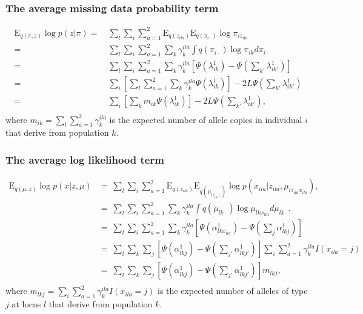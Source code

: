 \documentclass[12pt,a4paper,reqno]{article}
\newcommand{\E}{\text{E}{}}
\newcommand{\(}{\left(}
\newcommand{\)}{\right)}
\newcommand{\|}{\arrowvert}
\renewcommand{\digamma}{\Psi}
\begin{document}
\subsubsection{The average missing data probability term}
\begin{align*}
  \E_{q(\pi,z)}\log p(z|\pi) 
  =&~ \sum_{l} \sum_{i} \sum_{a=1}^{2} \E_{q(z_{ila})}\E_{q(\pi_{i\cdot})} \log \pi_{iz_{ila}} \\
  =&~ \sum_{l} \sum_{i} \sum_{a=1}^{2} \sum_{k} \gamma^{ila}_{k} \int q(\pi_{i\cdot}) \log \pi_{ik} d\pi_{i\cdot} \\
  =&~ \sum_{l} \sum_{i} \sum_{a=1}^{2} \sum_{k} \gamma^{ila}_{k} \left[\digamma(\lambda^{1}_{ik}) - \digamma(\sum_{k'}\lambda^{1}_{ik'})\right] \\
  =&~ \sum_{i} \left[ \sum_{l} \sum_{a=1}^{2} \sum_{k} \gamma^{ila}_{k} \digamma(\lambda^{1}_{ik})\right] - 2L\digamma(\sum_{k'}\lambda^{1}_{ik'})\\
  =&~ \sum_{i} \left[ \sum_{k} m_{ik} \digamma(\lambda^{1}_{ik})\right] - 2L\digamma(\sum_{k'}\lambda^{1}_{ik'}),\\
\end{align*}
where $m_{ik} = \sum_{l} \sum_{a=1}^{2} \gamma^{ila}_{k}$ is the expected number of allele copies in individual $i$ that derive from population $k$.

\subsubsection{The average log likelihood term}
\begin{align*}
  \E_{q(\mu,z)} \log p(x|z,\mu) 
  &=~ \sum_{l} \sum_{i} \sum_{a=1}^{2} \E_{q(z_{ila})} \E_{q(\mu_{lz_{ila}\cdot})} \log p(x_{ila}|z_{ila},\mu_{lz_{ila}x_{ila}}), \\
  &=~ \sum_{l} \sum_{i} \sum_{a=1}^{2} \sum_{k} \gamma^{ila}_{k} \int q(\mu_{lk\cdot})\log \mu_{lkx_{ila}} d\mu_{lk\cdot}. \\
  &=~ \sum_{l} \sum_{i} \sum_{a=1}^{2} \sum_{k} \gamma^{ila}_{k} \left[\digamma(\alpha^{1}_{lkx_{ila}}) - \digamma(\sum_{j}\alpha^{1}_{lkj})\right]\\
  &=~ \sum_{l} \sum_{k} \sum_{j} \left[\digamma(\alpha^{1}_{lkj}) - \digamma(\sum_{j'}\alpha^{1}_{lkj'})\right] \sum_{i} \sum_{a=1}^{2} \gamma^{ila}_{k}I(x_{ila}=j) \\
  &=~ \sum_{l} \sum_{k} \sum_{j} \left[\digamma(\alpha^{1}_{lkj}) - \digamma(\sum_{j'}\alpha^{1}_{lkj'})\right] m_{lkj}, \\
\end{align*}
where $m_{lkj} = \sum_{i} \sum_{a=1}^{2} \gamma^{ila}_{k}I(x_{ila}=j)$ is the expected number of alleles of type $j$ at locus $l$ that derive from population $k$.
\end{document}
